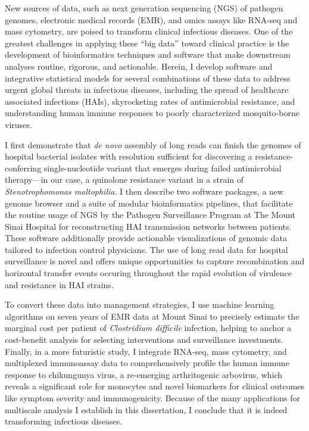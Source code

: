 
\noindent{}New sources of data, such as next generation sequencing (NGS) of pathogen ge\-nomes, electronic medical records (EMR), and omics assays like RNA-seq and mass cytometry, are poised to transform clinical infectious diseases. One of the greatest challenges in applying these ``big data'' toward clinical practice is the development of bioinformatics techniques and software that make downstream analyses routine, rigorous, and actionable. Herein, I develop software and integrative statistical models for several combinations of these data to address urgent global threats in infectious diseases, including the spread of healthcare associated infections (HAIs), skyrocketing rates of antimicrobial resistance, and understanding human immune responses to poorly characterized mosquito-borne viruses.

I first demonstrate that \emph{de novo} assembly of long reads can finish the genomes of hospital bacterial isolates with  resolution sufficient for discovering a resistance-conferring sin\-gle-\allowbreak nu\-cle\-o\-tide variant that emerges during failed antimicrobial the\-ra\-py—in our case, a quinolone resistance variant in a strain of \emph{Stenotrophomonas maltophilia}. I then describe two software packages, a new genome browser and a suite of modular bioinformatics pipelines, that facilitate the routine usage of NGS by the Pathogen Surveillance Program at The Mount Sinai Hospital for reconstructing HAI transmission networks between patients. These software additionally provide actionable visualizations of genomic data tailored to infection control physicians. The use of long read data for hospital surveillance is novel and offers unique opportunities to capture recombination and horizontal transfer events occuring throughout the rapid evolution of virulence and resistance in HAI strains. 

To convert these data into management strategies, I use machine learning algorithms on seven years of EMR data at Mount Sinai to precisely estimate the marginal cost per patient of \emph{Clostridium difficile} infection, helping to anchor a cost-benefit analysis for selecting interventions and surveillance investments. Finally, in a more futuristic study, I integrate RNA-seq, mass cytometry, and multiplexed immunoassay data to comprehensively profile the human immune response to chikungunya virus, a re-emerging arthritogenic arbovirus, which reveals a significant role for monocytes and novel biomarkers for clinical outcomes like symptom severity and immunogenicity. Because of the many applications for multiscale analysis I establish in this dissertation, I conclude that it is indeed transforming infectious diseases.